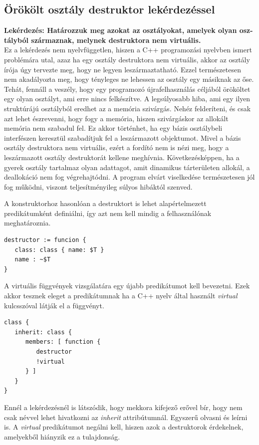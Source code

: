 \documentclass[a4paper,12pt]{report}
\begin{document}
\subsection{Örökölt osztály destruktor lekérdezéssel}
\textbf{Lekérdezés: Határozzuk meg azokat az osztályokat, amelyek olyan osz-tályból származnak, melynek destruktora nem virtuális.}
\\
Ez a lekérdezés nem nyelvfüggetlen, hiszen a C++ programozási nyelvben ismert problémára utal, azaz ha egy osztály destruktora nem virtuális, akkor az osztály írója úgy tervezte meg, hogy ne legyen leszármaztatható. Ezzel természetesen nem akadályozta meg, hogy tényleges ne lehessen az osztály egy másiknak az őse. Tehát, fennáll a veszély, hogy egy programozó újrafelhasználás céljából örököltet egy olyan osztályt, ami erre nincs felkészítve. A legsúlyosabb hiba, ami egy ilyen struktúrájú osztályból eredhet az a memória szivárgás. Nehéz felderíteni, és csak azt lehet észrevenni, hogy fogy a memória, hiszen szivárgáskor az allokált memória nem szabadul fel. Ez akkor történhet, ha egy bázis osztálybeli interfészen keresztül szabadítjuk fel a leszármazott objektumot. Mivel a bázis osztály destruktora nem virtuális, ezért a fordító nem is nézi meg, hogy a leszármazott osztály destruktorát kellene meghívnia. Következésképpen, ha a gyerek osztály tartalmaz olyan adattagot, amit dinamikus tárterületen allokál, a deallokáció nem fog végrehajtódni. A program elvárt viselkedése természetesen jól fog működni, viszont teljesítményileg súlyos hibáktól szenved.
\par A konstruktorhoz hasonlóan a destruktort is lehet alapértelmezett predikátumként definiálni, így azt nem kell mindig a felhasználónak meghatároznia.
\begin{verbatim}
destructor := funcion {
   class: class { name: $T }
   name : ~$T
}
\end{verbatim}
\par A virtuális függvények vizsgálatára egy újabb predikátumot kell bevezetni. Ezek akkor tesznek eleget a predikátumnak ha a C++ nyelv által használt \textit{virtual} kulcsszóval látják el a függvényt.
\begin{verbatim}
class {
   inherit: class {
      members: [ function { 
         destructor 
         !virtual 
      } ]
   }
}
\end{verbatim}
\par Ennél a lekérdezésnél is látszódik, hogy mekkora kifejező erővel bír, hogy nem csak névvel lehet hivatkozni az \textit{inherit} attribútumnál. Egyszerű olvasni és leírni is. A \textit{virtual} predikátumot negálni kell, hiszen azok a destruktorok érdekelnek, amelyekből hiányzik ez a tulajdonság.
\end{document}
